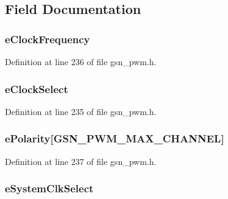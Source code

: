 \subsection{Field Documentation}
\hypertarget{a00181_aeb48843c5c889d4548415c812e319d89}{
\subsubsection[{eClockFrequency}]{ {\bf eClockFrequency}}}
\label{a00181_aeb48843c5c889d4548415c812e319d89}


Definition at line 236 of file gsn\_\-pwm.h.

\hypertarget{a00181_a5f9d20354a07d3b9705024ecca50bb08}{
\subsubsection[{eClockSelect}]{ {\bf eClockSelect}}}
\label{a00181_a5f9d20354a07d3b9705024ecca50bb08}


Definition at line 235 of file gsn\_\-pwm.h.

\hypertarget{a00181_a4debdbc31bfcc2a8fbdc335bd829ddda}{
\subsubsection[{ePolarity}]{ {\bf ePolarity}\mbox{[}GSN\_\-PWM\_\-MAX\_\-CHANNEL\mbox{]}}}
\label{a00181_a4debdbc31bfcc2a8fbdc335bd829ddda}


Definition at line 237 of file gsn\_\-pwm.h.

\hypertarget{a00181_a18088918d77b0fe6660b6720310157fa}{
\subsubsection[{eSystemClkSelect}]{ {\bf eSystemClkSelect}}}
\label{a00181_a18088918d77b0fe6660b6720310157fa}


